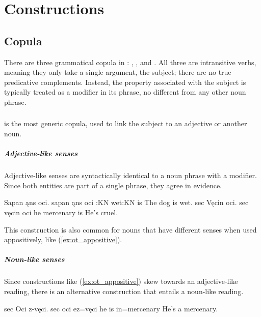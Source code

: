 \setchapterpreamble[u]{\margintoc}
\chapter{Constructions}

\section{Copula}
There are three grammatical copula in \langname{}: , , and . All three are intransitive verbs, meaning they only take a single argument, the subject; there are no true predicative complements. Instead, the property associated with the subject is typically treated as a modifier in its phrase, no different from any other noun phrase.

\subsection{}
 is the most generic copula, used to link the subject to an adjective or another noun.

\paragraph{Adjective-like senses}
Adjective-like senses are syntactically identical to a noun phrase with a  modifier. Since both entities are part of a single phrase, they agree in evidence. 

\begin{examples}
    \ex
        \script Sapan ąns oci.
        \bits sapan ąns oci
        :KN wet:KN is
        \tr The dog is wet. 
    \ex \label{ex:ot_appositive}
        \script sec Vęcin oci.
        \bits sec vęcin oci
        \gloss he mercenary is
        \tr He's cruel.
\end{examples}

This construction is also common for nouns that have different senses when used appositively, like (\ref{ex:ot_appositive}).

\paragraph{Noun-like senses}
Since constructions like (\ref{ex:ot_appositive}) skew towards an adjective-like reading, there is an alternative construction that entails a noun-like reading.

\begin{examples}
    \ex \label{ex:ot_disambiguation}
        \script sec Oci z-vęci.
        \bits sec oci ez=vęci
        \gloss he is in=mercenary
        \tr He's a mercenary.
\end{examples}


